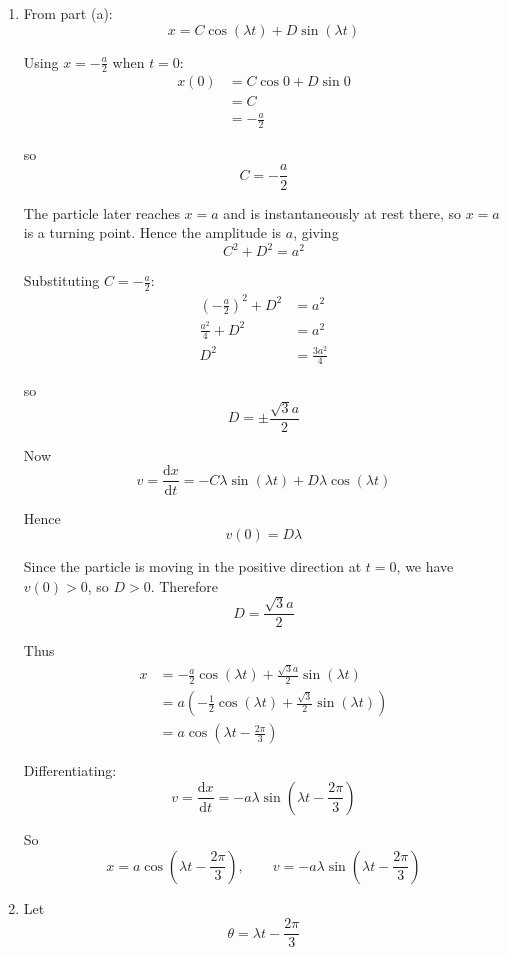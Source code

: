 \documentclass[leqno]{article}
\begin{document}
\begin{enumerate}[
  label=\textbf{\arabic*.},
  leftmargin=*,
  topsep=0pt,
  partopsep=0pt,
  parsep=0pt
]
\begin{djsSolution}
\begin{enumerate}[label=\textbf{(\alph*)}]
  is
  \[
  x=C\cos(\lambda t)+D\sin(\lambda t)
  \]

  where $C$ and $D$ are constants.

  \item From part (a):
  \[
  x=C\cos(\lambda t)+D\sin(\lambda t)
  \]

  Using $x=-\frac{a}{2}$ when $t=0$:
  \begin{align*}
  x(0)&=C\cos 0+D\sin 0\\
      &=C\\
      &=-\frac{a}{2}
  \end{align*}

  so
  \[
  C=-\frac{a}{2}
  \]

  The particle later reaches $x=a$ and is instantaneously at rest there, so $x=a$ is a turning point. Hence the amplitude is $a$, giving
  \[
  C^2+D^2=a^2
  \]

  Substituting $C=-\frac{a}{2}$:
  \begin{align*}
  \left(-\frac{a}{2}\right)^2+D^2&=a^2\\
  \frac{a^2}{4}+D^2&=a^2\\
  D^2&=\frac{3a^2}{4}
  \end{align*}

  so
  \[
  D=\pm \frac{\sqrt{3}a}{2}
  \]

  Now
  \[
  v=\frac{\mathrm{d}x}{\mathrm{d}t}=-C\lambda \sin(\lambda t)+D\lambda \cos(\lambda t)
  \]

  Hence
  \[
  v(0)=D\lambda
  \]

  Since the particle is moving in the positive direction at $t=0$, we have $v(0)>0$, so $D>0$. Therefore
  \[
  D=\frac{\sqrt{3}a}{2}
  \]

  Thus
  \begin{align*}
  x&=-\frac{a}{2}\cos(\lambda t)+\frac{\sqrt{3}a}{2}\sin(\lambda t)\\
   &=a\left(-\frac{1}{2}\cos(\lambda t)+\frac{\sqrt{3}}{2}\sin(\lambda t)\right)\\
   &=a\cos\left(\lambda t-\frac{2\pi}{3}\right)
  \end{align*}

  Differentiating:
  \[
  v=\frac{\mathrm{d}x}{\mathrm{d}t}=-a\lambda \sin\left(\lambda t-\frac{2\pi}{3}\right)
  \]

  So
  \[
  x=a\cos\left(\lambda t-\frac{2\pi}{3}\right),\qquad
  v=-a\lambda \sin\left(\lambda t-\frac{2\pi}{3}\right)
  \]

  \item Let
  \[
  \theta=\lambda t-\frac{2\pi}{3}
  \]


\end{enumerate}
\end{djsSolution}
\end{enumerate}
\end{document}
